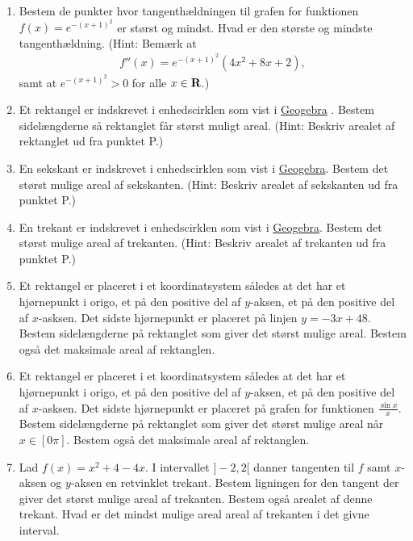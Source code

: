 \begin{enumerate}
	
	\item Bestem de punkter hvor tangenthældningen til grafen for funktionen $f(x)=e^{-(x+1)^2}$ er størst og mindst. Hvad er den største og mindste tangenthældning. (Hint:	Bemærk at 
		\begin{align*}
		f''(x)=e^{-(x+1)^2}(4x^2+8x+2),
		\end{align*}
	samt at $e^{-(x+1)^2}>0$ for alle $x\in \mathbf{R}$.)


	\item Et rektangel er indskrevet i enhedscirklen som vist i \href{https://www.geogebra.org/m/efDNd8KK}{Geogebra} . Bestem sidelængderne så rektanglet får størst muligt areal. (Hint: Beskriv arealet af rektanglet ud fra punktet P.)
	
	\item En sekskant er indskrevet i enhedscirklen som vist i \href{https://www.geogebra.org/m/efDNd8KK}{Geogebra}. Bestem det størst mulige areal af sekskanten. (Hint: Beskriv arealet af sekskanten ud fra punktet P.)

	\item En trekant er indskrevet i enhedscirklen som vist i \href{https://www.geogebra.org/m/efDNd8KK}{Geogebra}. Bestem det størst mulige areal af trekanten. (Hint: Beskriv arealet af trekanten ud fra punktet P.)
	
	\item Et rektangel er placeret i et koordinatsystem således at det har et hjørnepunkt i origo, et på den positive del af $y$-aksen, et på den positive del af $x$-asksen. Det sidste hjørnepunkt er placeret på linjen $y=-3x+48$. Bestem sidelængderne på rektanglet som giver det størst mulige areal. Bestem også det maksimale areal af rektanglen.
	
	\item Et rektangel er placeret i et koordinatsystem således at det har et hjørnepunkt i origo, et på den positive del af $y$-aksen, et på den positive del af $x$-asksen. Det sidste hjørnepunkt er placeret på grafen for funktionen $\frac{\sin x}{x}$. Bestem sidelængderne på rektanglet som giver det størst mulige areal når $x\in[0\pi]$. Bestem også det maksimale areal af rektanglen.
	
	
	\item Lad $f(x)=x^2+4-4x$. I intervallet $]-2,2[ $ danner tangenten til $f$ samt $x$-aksen og $y$-aksen en retvinklet trekant. Bestem ligningen for den tangent der giver det størst mulige areal af trekanten. Bestem også arealet af denne trekant. Hvad er det mindst mulige areal areal af trekanten i det givne interval.
	

\end{enumerate}
